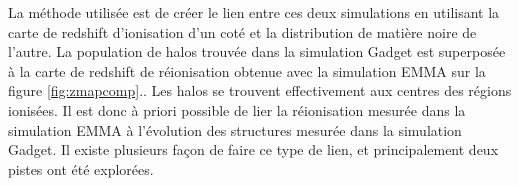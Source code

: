 La méthode utilisée est de créer le lien entre ces deux simulations en utilisant la carte de redshift d'ionisation d'un coté et la distribution de matière noire de l'autre.
La population de halos trouvée dans la simulation Gadget est superposée à la carte de redshift de réionisation obtenue avec la simulation EMMA sur la figure \ref{fig:zmapcomp}..
Les halos se trouvent effectivement aux centres des régions ionisées.
Il est donc à priori possible de lier la réionisation mesurée dans la simulation EMMA à l'évolution des structures mesurée dans la simulation Gadget.
Il existe plusieurs façon de faire ce type de lien, et principalement deux pistes ont été explorées.



